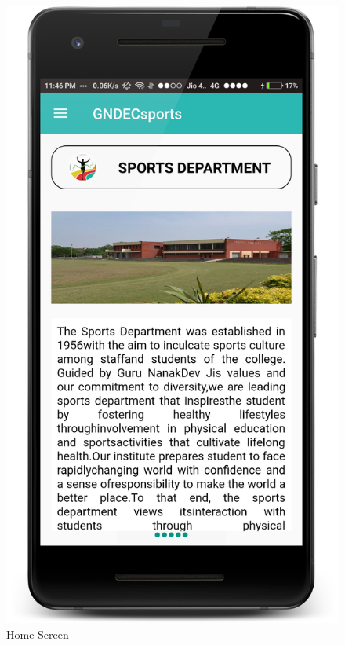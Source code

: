 \newpage
\begin{figure}[ht]
\centering
\includegraphics[scale=0.20]{images/S2.png}
\caption{Home Screen}
\end{figure}

\newpage

